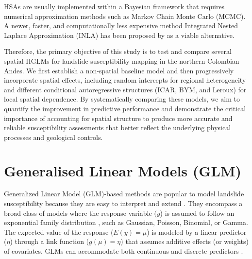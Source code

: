 \documentclass[journal abbreviation, manuscript]{copernicus}
\begin{document}
HSAs are usually implemented within a Bayesian framework that requires numerical approximation methods such as Markov Chain Monte Carlo (MCMC). A newer, faster, and computationally less expensive method Integrated Nested Laplace Approximation (INLA) has been proposed by \citet{rue2005gaussian} as a viable alternative.

Therefore, the primary objective of this study is to test and compare several spatial HGLMs for landslide susceptibility mapping in the northern Colombian Andes. We first establish a non-spatial baseline model and then progressively incorporate spatial effects, including random intercepts for regional heterogeneity and different conditional autoregressive structures (ICAR, BYM, and Leroux) for local spatial dependence. By systematically comparing these models, we aim to quantify the improvement in predictive performance and demonstrate the critical importance of accounting for spatial structure to produce more accurate and reliable susceptibility assessments that better reflect the underlying physical processes and geological controls.


\section{Generalised Linear Models (GLM)}\label{sec2}

Generalized Linear Model (GLM)-based methods are popular to model landslide susceptibility because they are easy to interpret and extend \citep{reichenbach2018review, corominas2014recommendations, guzzetti1999landslide}. They encompass a broad class of models where the response variable ($y$) is assumed to follow an exponential family distribution \citep{coxe2013generalized, hastie2017generalized}, such as Gaussian, Poisson, Binomial, or Gamma. The expected value of the response ($E(y) = \mu$) is modeled by a linear predictor ($\eta$) through a link function ($g(\mu) = \eta$) that assumes additive effects (or weights) of covariates. GLMs can accommodate both continuous and discrete predictors \citep{camilo2017handling, goetz2011integrating}.
\end{document}
